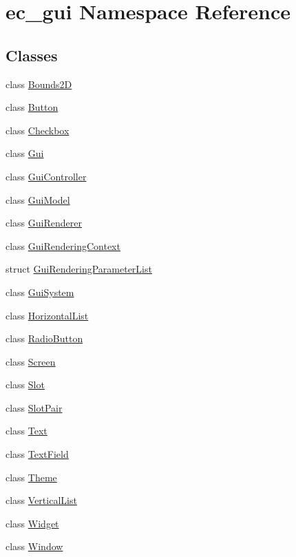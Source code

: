 \hypertarget{namespaceec__gui}{}\section{ec\+\_\+gui Namespace Reference}
\label{namespaceec__gui}
\subsection*{Classes}
\begin{DoxyCompactItemize}
\item 
class \mbox{\hyperlink{classec__gui_1_1_bounds2_d}{Bounds2D}}
\item 
class \mbox{\hyperlink{classec__gui_1_1_button}{Button}}
\item 
class \mbox{\hyperlink{classec__gui_1_1_checkbox}{Checkbox}}
\item 
class \mbox{\hyperlink{classec__gui_1_1_gui}{Gui}}
\item 
class \mbox{\hyperlink{classec__gui_1_1_gui_controller}{Gui\+Controller}}
\item 
class \mbox{\hyperlink{classec__gui_1_1_gui_model}{Gui\+Model}}
\item 
class \mbox{\hyperlink{classec__gui_1_1_gui_renderer}{Gui\+Renderer}}
\item 
class \mbox{\hyperlink{classec__gui_1_1_gui_rendering_context}{Gui\+Rendering\+Context}}
\item 
struct \mbox{\hyperlink{structec__gui_1_1_gui_rendering_parameter_list}{Gui\+Rendering\+Parameter\+List}}
\item 
class \mbox{\hyperlink{classec__gui_1_1_gui_system}{Gui\+System}}
\item 
class \mbox{\hyperlink{classec__gui_1_1_horizontal_list}{Horizontal\+List}}
\item 
class \mbox{\hyperlink{classec__gui_1_1_radio_button}{Radio\+Button}}
\item 
class \mbox{\hyperlink{classec__gui_1_1_screen}{Screen}}
\item 
class \mbox{\hyperlink{classec__gui_1_1_slot}{Slot}}
\item 
class \mbox{\hyperlink{classec__gui_1_1_slot_pair}{Slot\+Pair}}
\item 
class \mbox{\hyperlink{classec__gui_1_1_text}{Text}}
\item 
class \mbox{\hyperlink{classec__gui_1_1_text_field}{Text\+Field}}
\item 
class \mbox{\hyperlink{classec__gui_1_1_theme}{Theme}}
\item 
class \mbox{\hyperlink{classec__gui_1_1_vertical_list}{Vertical\+List}}
\item 
class \mbox{\hyperlink{classec__gui_1_1_widget}{Widget}}
\item 
class \mbox{\hyperlink{classec__gui_1_1_window}{Window}}
\end{DoxyCompactItemize}
